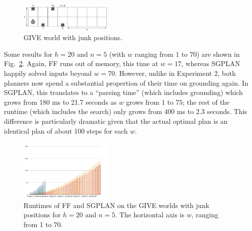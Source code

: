 \begin{figure}
  \centering
  \includegraphics[width=0.4\textwidth]{pic-empty-buttons}
  \caption{GIVE world with junk positions.}
  \label{fig:give-junk}
\end{figure}

Some results for $h=20$ and $n=5$ (with $w$ ranging from $1$ to $70$)
are shown in Fig.~\ref{fig:give-runtime-junk}.  Again, FF runs out of
memory, this time at $w=17$, whereas SGPLAN happily solved inputs
beyond $w=70$.  However, unlike in Experiment 2, both planners now
spend a substantial propertion of their time on grounding again.  In
SGPLAN, this translates to a ``parsing time'' (which
 includes grounding) which grows from 180 ms to 21.7
seconds as $w$ grows from $1$ to $75$; the rest of the runtime (which
includes the search) only grows from 400 ms to 2.3 seconds.  This
difference is particularly dramatic given that the actual optimal plan
is an identical plan of about 100 steps for each $w$.

\begin{figure}
  \centering
  \includegraphics[width=0.4\textwidth]{pic-runtime-empty-world}
  \caption{Runtimes of FF and SGPLAN on the GIVE worlds with junk
    positions for $h=20$ and $n=5$. The horizontal axis is $w$,
    ranging from 1 to 70.}
  \label{fig:give-runtime-junk}
\end{figure}


